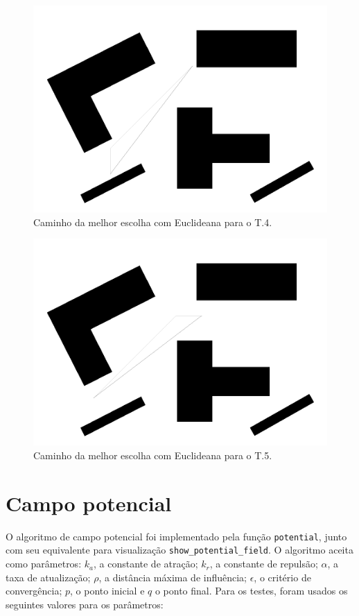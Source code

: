 \documentclass[12pt]{article}
\theoremstyle{plain}
\numberwithin{equation}{section}
\newcommand{\code}[1]{\lstinline[mathescape=true]{#1}}
\begin{document}
\begin{figure}[H]
  \centering\includegraphics[scale=0.4]{imgs/best_choice_euclidean_4.png}
  \caption{Caminho da melhor escolha com Euclideana para o T.4.}
\end{figure}

\begin{figure}[H]
  \centering\includegraphics[scale=0.4]{imgs/best_choice_euclidean_5.png}
  \caption{Caminho da melhor escolha com Euclideana para o T.5.}
\end{figure}

\section{Campo potencial}

O algoritmo de campo potencial foi implementado pela função \code{potential}, junto com seu
equivalente para visualização \code{show_potential_field}. O algoritmo aceita como parâmetros:
$k_a$, a constante de atração; $k_r$, a constante de repulsão; $\alpha$, a taxa de atualização;
$\rho$, a distância máxima de influência; $\epsilon$, o critério de convergência; $p$, o ponto
inicial e $q$ o ponto final. Para os testes, foram usados os seguintes valores para os parâmetros:
\end{document}
